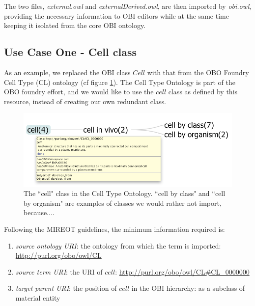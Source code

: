 \documentclass[a4paper,10pt,twocolumn]{article}
\begin{document}
The two files, \emph{external.owl} and \emph{externalDerived.owl}, are then imported by \emph{obi.owl}, providing the necessary information to OBI editors while at the same time keeping it isolated from the core OBI ontology.


\subsection*{Use Case One - Cell class}

As an example, we replaced the OBI class $Cell$ with that from the OBO Foundry Cell Type (CL) ontology (cf figure \ref{fig:cell}).
The Cell Type Ontology \cite{RefWorks:1559} is part of the OBO foundry effort, and we would like to use the $cell$ class as defined by this resource, instead of creating our own redundant class.

\begin{figure}[t]
\centering \includegraphics*[width=1\columnwidth]{./figs/cell}
\caption{The ``cell" class in the Cell Type Ontology. ``cell by class" and ``cell by organism" are examples of classes we would rather not import, because....}
\label{fig:cell}
\end{figure}

Following the MIREOT guidelines, the minimum information required is:  

\begin{enumerate}
\item \textit{source ontology URI}: the ontology from which the term is imported: \url{http://purl.org/obo/owl/CL}
\item \textit{source term URI}: the URI of $cell$: \url{http://purl.org/obo/owl/CL#CL_0000000}
\item \textit{target parent URI}: the position of $cell$ in the OBI hierarchy: as a subclass of material entity %
\end{enumerate}
\end{document}
